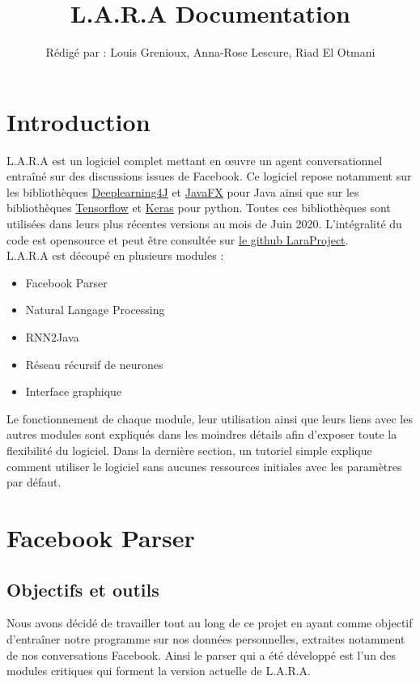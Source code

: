 \documentclass[10pt,a4paper]{article}
\title{L.A.R.A Documentation}
\author{Rédigé par : Louis Grenioux, Anna-Rose Lescure, Riad El Otmani}
\newcommand\tab[1][0.5cm]{\hspace*{#1}}
\begin{document}
\maketitle
\tableofcontents

\newpage

\section{Introduction}
L.A.R.A est un logiciel complet mettant en œuvre un agent conversationnel entraîné sur des discussions issues de Facebook. Ce logiciel repose notamment sur les bibliothèques \href{https://deeplearning4j.org/}{Deeplearning4J} et \href{https://openjfx.io/}{JavaFX} pour Java ainsi que sur les bibliothèques \href{https://www.tensorflow.org/}{Tensorflow} et \href{https://keras.io/}{Keras} pour python. Toutes ces bibliothèques sont utilisées dans leurs plus récentes versions au mois de Juin 2020. L'intégralité du code est opensource et peut être consultée sur \href{https://github.com/LaraProject}{le github LaraProject}. \\
\tab L.A.R.A est découpé en plusieurs modules :
\begin{itemize}
\item Facebook Parser
\item Natural Langage Processing
\item RNN2Java
\item Réseau récursif de neurones
\item Interface graphique
\end{itemize}
Le fonctionnement de chaque module, leur utilisation ainsi que leurs liens avec les autres modules sont expliqués dans les moindres détails afin d'exposer toute la flexibilité du logiciel. Dans la dernière section, un tutoriel simple explique comment utiliser le logiciel sans aucunes ressources initiales avec les paramètres par défaut.
 
\section{Facebook Parser}
\subsection{Objectifs et outils}
Nous avons décidé de travailler tout au long de ce projet en ayant comme objectif d'entraîner notre programme sur nos données personnelles, extraites notamment de nos conversations Facebook. Ainsi le parser qui a été développé est l'un des modules critiques qui forment la version actuelle de L.A.R.A.
\end{document}
